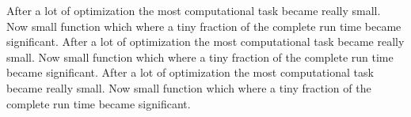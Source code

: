 After a lot of optimization the most computational task became really small. Now
small function which where a tiny fraction of the complete run time became 
significant. 
After a lot of optimization the most computational task became really small. Now
small function which where a tiny fraction of the complete run time became 
significant. 
After a lot of optimization the most computational task became really small. Now
small function which where a tiny fraction of the complete run time became 
significant. 










